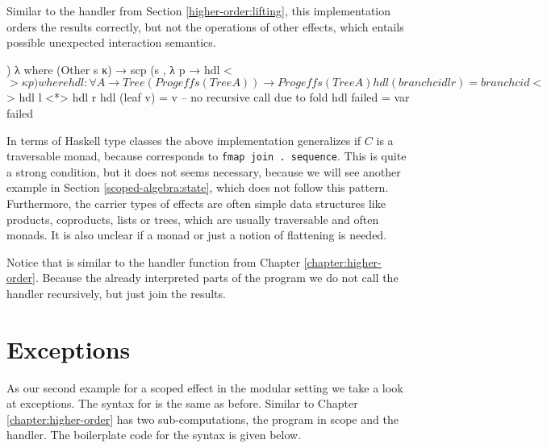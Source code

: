 \begin{AgdaAlign}
Similar to the handler from Section \ref{higher-order:lifting}, this
implementation orders the results correctly, but not the operations of other
effects, which entails possible unexpected interaction semantics.

\begin{code}
  ) λ where
    (Other s κ)  → scp (s , λ p → hdl <$> κ p)
  where
    hdl : ∀ {A} → Tree (Prog effs (Tree A)) → Prog effs (Tree A)
    hdl (branch cid l r)  = branch cid <$> hdl l <*> hdl r
    hdl (leaf v)          = v -- no recursive call due to fold
    hdl failed            = var failed
\end{code}
\end{AgdaAlign}
In terms of Haskell type classes the above implementation generalizes if $C$ is
a traversable monad, because  corresponds to
\texttt{fmap join . sequence}.
This is quite a strong condition, but it does not seems necessary, because we
will see another example in Section \ref{scoped-algebra:state}, which does not
follow this pattern.
Furthermore, the carrier types of effects are often simple data structures like
products, coproducts, lists or trees, which are usually traversable and often
monads.
It is also unclear if a monad or just a notion of flattening is needed.


Notice that  is similar to the handler function from
Chapter \ref{chapter:higher-order}.
Because the  already interpreted parts of the program we do
not call the handler recursively, but just join the results.


\section{Exceptions}

As our second example for a scoped effect in the modular setting we take a look
at exceptions.
The syntax for  is the same as before.
Similar to Chapter \ref{chapter:higher-order}  has two
sub-computations, the program in scope and the handler.
The boilerplate code for the syntax is given below.

